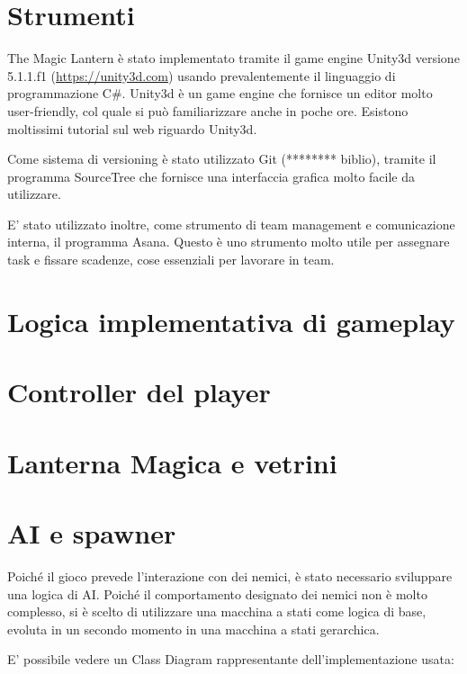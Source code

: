 \section{Strumenti}

The Magic Lantern è stato implementato tramite il game engine Unity3d versione 5.1.1.f1 (\url{https://unity3d.com}) usando prevalentemente il linguaggio di programmazione C\#. Unity3d è un game engine che fornisce un editor molto user-friendly, col quale si può familiarizzare anche in poche ore. Esistono moltissimi tutorial sul web riguardo Unity3d.

Come sistema di versioning è stato utilizzato Git (******** biblio), tramite il programma SourceTree che fornisce una interfaccia grafica molto facile da utilizzare.

E' stato utilizzato inoltre, come strumento di team management e comunicazione interna, il programma Asana. Questo è uno strumento molto utile per assegnare task e fissare scadenze, cose essenziali per lavorare in team.


\section{Logica implementativa di gameplay}

\section{Controller del player}

\section{Lanterna Magica e vetrini}


\section{AI e spawner}

Poiché il gioco prevede l'interazione con dei nemici, è stato necessario sviluppare una logica di AI. Poiché il comportamento designato dei nemici non è molto complesso, si è scelto di utilizzare una macchina a stati come logica di base, evoluta in un secondo momento in una macchina a stati gerarchica.

E' possibile vedere un Class Diagram rappresentante dell'implementazione usata:

